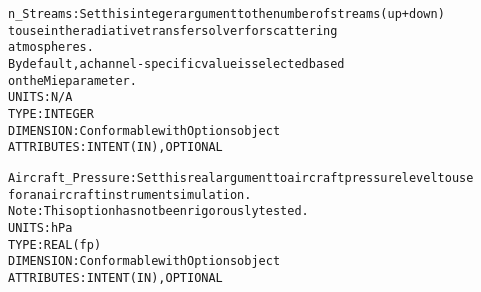 \begin{alltt}
    n_Streams:                Set this integer argument to the number of streams (up + down)
                              to use in the radiative transfer solver for scattering
                              atmospheres.
                              By default, a channel-specific value is selected based
                              on the Mie parameter.
                              UNITS:      N/A
                              TYPE:       INTEGER
                              DIMENSION:  Conformable with Options object
                              ATTRIBUTES: INTENT(IN), OPTIONAL
                                           
    Aircraft_Pressure:        Set this real argument to aircraft pressure level to use
                              for an aircraft instrument simulation.
                              Note: This option has not been rigorously tested.
                              UNITS:      hPa
                              TYPE:       REAL(fp)
                              DIMENSION:  Conformable with Options object
                              ATTRIBUTES: INTENT(IN), OPTIONAL
                                               
  \end{alltt}
